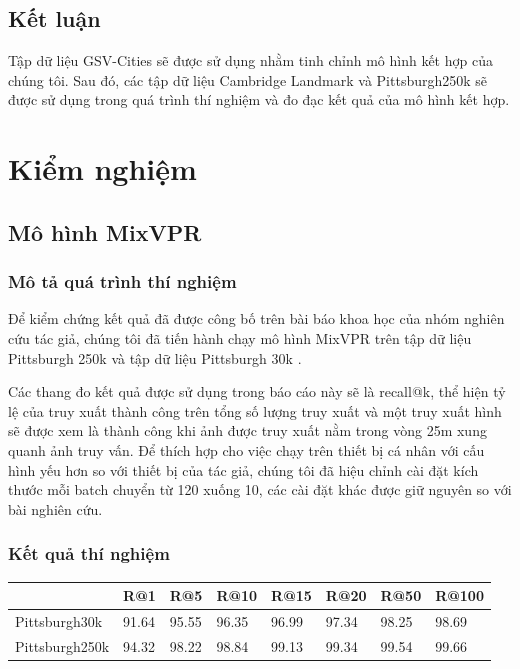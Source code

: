 \subsection{Kết luận}
Tập dữ liệu GSV-Cities \cite{Ali_bey_2022} sẽ được sử dụng nhằm tinh chỉnh mô hình kết hợp của chúng tôi. Sau đó, các tập dữ liệu Cambridge Landmark \cite{kendall2016posenet} và Pittsburgh250k \cite{6618963} sẽ được sử dụng trong quá trình thí nghiệm và đo đạc kết quả của mô hình kết hợp.

\section{Kiểm nghiệm}
\subsection{Mô hình MixVPR}
\subsubsection*{Mô tả quá trình thí nghiệm}

Để kiểm chứng kết quả đã được công bố trên bài báo khoa học của nhóm nghiên cứu tác giả, chúng tôi đã tiến hành chạy mô hình MixVPR \cite{alibey2023mixvpr} trên tập dữ liệu Pittsburgh 250k \cite{6618963} và tập dữ liệu Pittsburgh 30k \cite{6618963}.

Các thang đo kết quả được sử dụng trong báo cáo này sẽ là recall@k, thể hiện tỷ lệ của truy xuất thành công trên tổng số lượng truy xuất và một truy xuất hình sẽ được xem là thành công khi ảnh được truy xuất nằm trong vòng 25m xung quanh ảnh truy vấn. Để thích hợp cho việc chạy trên thiết bị cá nhân với cấu hình yếu hơn so với thiết bị của tác giả, chúng tôi đã hiệu chỉnh cài đặt kích thước mỗi batch chuyển từ 120 xuống 10, các cài đặt khác được giữ nguyên so với bài nghiên cứu.

\subsubsection*{Kết quả thí nghiệm}

\begin{table}[H]
	\centering
	\begin{tabular}{|l|l|l|l|l|l|l|l|}
		\hline
		               & \textbf{R@1} & \textbf{R@5} & \textbf{R@10} & \textbf{R@15} & \textbf{R@20} & \textbf{R@50} & \textbf{R@100} \\ \hline
		Pittsburgh30k  & 91.64        & 95.55        & 96.35         & 96.99         & 97.34         & 98.25         & 98.69          \\ \hline
		Pittsburgh250k & 94.32        & 98.22        & 98.84         & 99.13         & 99.34         & 99.54         & 99.66          \\ \hline
	\end{tabular}
\end{table}

